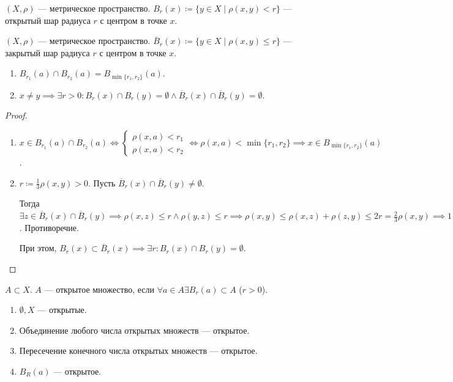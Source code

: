 \begin{definition}
    $(X, \rho)$ --- метрическое пространство.  $B_r(x) \coloneqq \{y \in X \mid \rho(x, y) < r\}$ --- открытый шар радиуса  $r$ с центром в точке  $x$. 
\end{definition}
\begin{definition}
    $(X, \rho)$ --- метрическое пространство.  $\overline{B}_r(x) \coloneqq \{y \in X \mid \rho(x, y) \le r\}$ --- закрытый шар радиуса  $r$ с центром в точке  $x$. 
\end{definition}
\begin{properties}
    \begin{enumerate}
        \item $B_{r_1}(a) \cap B_{r_2}(a) = B_{\min\{r_1, r_2\}}(a)$.
        \item $x \neq y \implies \exists r > 0\!: B_r(x) \cap B_r(y) = \emptyset \land \overline{B}_r(x) \cap \overline{B}_r(y) = \emptyset$.
    \end{enumerate}
\end{properties}
\begin{proof}
    \begin{enumerate}
        \item $x \in B_{r_1}(a) \cap B_{r_2}(a) \iff \begin{cases} \rho(x, a) < r_1 \\ \rho(x, a) < r_2 \end{cases} \iff \rho(x, a) < \min\{r_1, r_2\} \implies x \in B_{\min\{r_1, r_2\}}(a)$.
        \item $r \coloneqq \frac{1}{3} \rho(x, y) > 0$. Пусть $\overline{B}_r(x) \cap \overline{B}_r(y) \neq \emptyset$. 

            Тогда  $\exists z \in \overline{B}_r(x) \cap \overline{B}_r(y) \implies \rho(x, z) \le r \land \rho(y, z) \le r \implies \rho(x, y) \le \rho(x, z) + \rho(z, y) \le 2r = \frac{2}{3} \rho(x, y) \implies 1 \le \frac{2}{3}$. Противоречие.

            При этом, $B_r(x) \subset \overline{B}_r(x) \implies \exists r\!: B_r(x) \cap B_r(y) = \emptyset$.
    \end{enumerate}
\end{proof}
\begin{definition}
    $A \subset X$.  $A$ --- открытое множество, если  $\forall a \in A \exists B_r(a) \subset A$ ($r > 0$).
\end{definition}
\begin{theorem}
    \begin{enumerate}
        \item $\emptyset, X$ --- открытые.
        \item Объединение любого числа открытых множеств --- открытое.
        \item Пересечение конечного числа открытых множеств --- открытое.
        \item $B_R(a)$ --- открытое.
    \end{enumerate}
\end{theorem}
